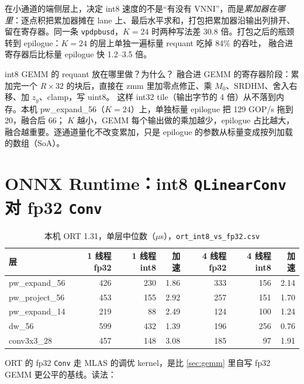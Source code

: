 \documentclass[11pt,a4paper]{ctexart}
\begin{document}
\begin{findingbox}
在小通道的端侧层上，决定 int8 速度的不是“有没有 VNNI”，而是\emph{累加器在哪里}：逐点积把累加器摊在 lane 上、最后水平求和，打包把累加器沿输出列排开、
留在寄存器。同一条 \texttt{vpdpbusd}，$K=24$ 时两种写法差 30.8 倍。打包之后的瓶颈转到 epilogue：$K=24$ 的层上单独一遍标量 requant 吃掉 84\% 的吞吐，
融合进寄存器后比标量 epilogue 快 1.2--3.5 倍。
\end{findingbox}

\begin{iqbox}{int8 GEMM 的 requant 放在哪里做？为什么？}
融合进 GEMM 的寄存器阶段：累加完一个 $R\times 32$ 的块后，直接在 zmm 里加零点修正、乘 $M_0$、SRDHM、舍入右移、加 $z_y$、clamp，写 uint8。
这样 int32 tile（输出字节的 4 倍）从不落到内存。本机 pw\_expand\_56（$K=24$）上，单独标量 epilogue 把 129 GOP/s 拖到 20，融合后 66；
$K$ 越小，GEMM 每个输出做的乘加越少，epilogue 占比越大，融合越重要。逐通道量化不改变累加，只是 epilogue 的参数从标量变成按列加载的数组（SoA）。
\end{iqbox}

\section{ONNX Runtime：int8 \texttt{QLinearConv} 对 fp32 \texttt{Conv}}\label{sec:ort}

\begin{table}[H]
\centering\small
\caption{本机 ORT 1.31，单层中位数（$\mu$s），\texttt{ort\_int8\_vs\_fp32.csv}}\label{tab:ort}
\begin{tabular}{lrrrrrr}
\toprule
层 & 1 线程 fp32 & 1 线程 int8 & 加速 & 4 线程 fp32 & 4 线程 int8 & 加速 \\
\midrule
pw\_expand\_56 & 426 & 230 & 1.86 & 333 & 156 & 2.14 \\
pw\_project\_56 & 453 & 155 & 2.92 & 257 & 151 & 1.70 \\
pw\_expand\_14 & 219 & 88 & 2.49 & 124 & 100 & 1.24 \\
dw\_56 & 599 & 432 & 1.39 & 196 & 256 & 0.76 \\
conv3x3\_28 & 457 & 148 & 3.08 & 185 & 97 & 1.91 \\
\bottomrule
\end{tabular}
\end{table}

ORT 的 fp32 \texttt{Conv} 走 MLAS 的调优 kernel，是比 \cref{sec:gemm} 里自写 fp32 GEMM 更公平的基线。读法：
\end{document}
